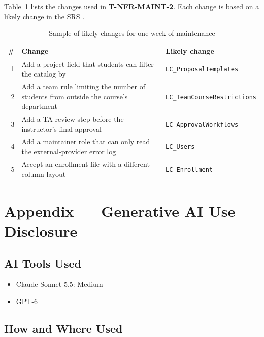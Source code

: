 \documentclass[12pt, titlepage]{article}
\begin{document}
Table~\ref{tab:change-sample} lists the changes used in
\hyperref[T-NFR-MAINT-2]{\textbf{T-NFR-MAINT-2}}. Each change is based on a
likely change in the SRS \citep{SRS}.

\begin{table}[h]
\centering
\caption{Sample of likely changes for one week of maintenance}
\label{tab:change-sample}
\begin{tabularx}{\textwidth}{r >{\raggedright\arraybackslash}X l}
  \toprule
  \textbf{\#} & \textbf{Change} & \textbf{Likely change} \\
  \midrule
  1 & Add a project field that students can filter the catalog by &
  \texttt{LC\_ProposalTemplates} \\
  2 & Add a team rule limiting the number of students from outside the
  course's department & \texttt{LC\_TeamCourseRestrictions} \\
  3 & Add a TA review step before the instructor's final approval &
  \texttt{LC\_ApprovalWorkflows} \\
  4 & Add a maintainer role that can only read the external-provider error
  log & \texttt{LC\_Users} \\
  5 & Accept an enrollment file with a different column layout &
  \texttt{LC\_Enrollment} \\
  \bottomrule
\end{tabularx}
\end{table}

  \newpage{}

\section{Appendix --- Generative AI Use Disclosure}


\subsection{AI Tools Used}


\begin{itemize}
  \item Claude Sonnet 5.5: Medium
  \item GPT-6
\end{itemize}

\subsection{How and Where Used}
\end{document}
